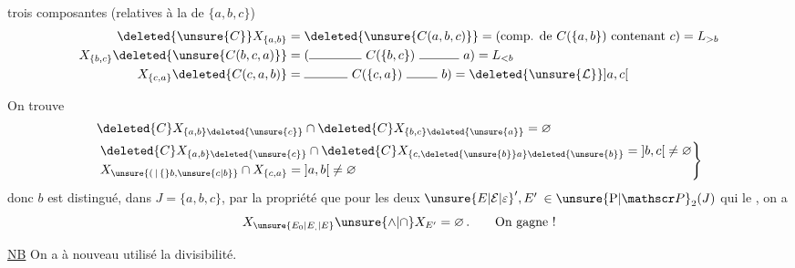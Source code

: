 trois composantes (relatives à la  de $\{a,b,c\}$)
\[
\begin{aligned}
\deleted{\unsure{C}}X_{\{a,b\}}&=\deleted{\unsure{C(a,b,c)}}=(\text{comp. de }C(\{a,b\})\text{ contenant }c)=L_{>b}\\
X_{\{b,c\}}\deleted{\unsure{C(b,c,a)}}&=(\rule{1.45cm}{.4pt}\ C(\{b,c\})\ \rule{1.1cm}{.4pt}\ a)=L_{<b}\\
X_{\{c,a\}}\deleted{C(c,a,b)}&=\rule{1.2cm}{.4pt}\ C(\{c,a\})\ \rule{.85cm}{.4pt}\ b)=\deleted{\unsure{\mathcal L}}\mathopen{]}a,c\mathclose{[}
\end{aligned}
\]

On trouve
\[
\begin{aligned}
&\deleted{C}X_{\{a,b\}\deleted{\unsure{c}}}\cap\deleted{C}X_{\{b,c\}\deleted{\unsure{a}}}=\varnothing\\
&\left.\begin{aligned}
&\deleted{C}X_{\{a,b\}\deleted{\unsure{c}}}\cap\deleted{C}X_{\{c,\deleted{\unsure{b}}a\}\deleted{\unsure{b}}}=\mathopen{]}b,c\mathclose{[}\ne\varnothing\\
&X_{\unsure{(\,|\,\{}b,\unsure{c|b}\}}\cap X_{\{c,a\}}=\mathopen{]}a,b\mathclose{[}\ne\varnothing
\end{aligned}\right\}
\end{aligned}
\]
donc $b$ est distingué, dans $J=\{a,b,c\}$, par la propriété que pour les deux  ${\unsure{E|\mathcal E|\varepsilon}}',E'$  $\in\unsure{\mathrm P|\mathscr P}_2(J)$ qui le , on a
\[
 X_{\unsure{E_{0}|E_{,}|E}}\unsure{\wedge|\cap}X_{E'}=\varnothing\,.\qquad\text{On gagne !}
\]

\uline{NB} On a à nouveau utilisé la divisibilité.

